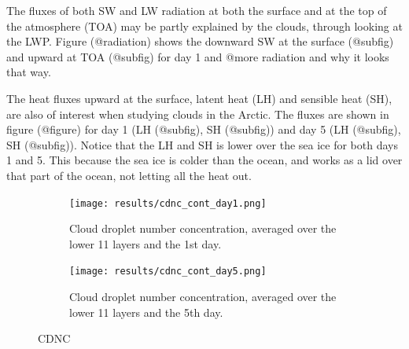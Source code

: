 The fluxes of both SW and LW radiation at both the surface and at the top of the atmosphere (TOA) may be partly explained by the clouds, through looking at the LWP. Figure (@radiation) shows the downward SW at the surface (@subfig) and upward at TOA (@subfig) for day 1 and @more radiation and why it looks that way.

The heat fluxes upward at the surface, latent heat (LH) and sensible heat (SH), are also of interest when studying clouds in the Arctic. The fluxes are shown in figure (@figure) for day 1 (LH (@subfig), SH (@subfig)) and day 5 (LH (@subfig), SH (@subfig)). Notice that the LH and SH is lower over the sea ice for both days 1 and 5. This because the sea ice is colder than the ocean, and works as a lid over that part of the ocean, not letting all the heat out.

\begin{figure}
	\begin{subfigure}{0.48\textwidth}
		\centering
		\texttt{[image: results/cdnc\_cont\_day1.png]}
		\caption{Cloud droplet number concentration, averaged over the lower 11 layers and the 1st day.}
		\label{subfig:cdnc_cont_Day1}
	\end{subfigure}
	\begin{subfigure}{0.48\textwidth}
		\centering
		\texttt{[image: results/cdnc\_cont\_day5.png]}
		\caption{Cloud droplet number concentration, averaged over the lower 11 layers and the 5th day.}
		\label{subfig:cdnc_cont_Day5}
	\end{subfigure}
	\caption{CDNC}
	\label{fig:cdnc}
\end{figure}

